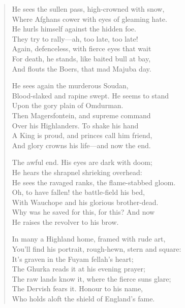 \begin{verse}
He sees the sullen pass, high-crowned with snow,\\
\hspace*{3em}Where Afghans cower with eyes of gleaming hate.\\
He hurls himself against the hidden foe.\\
\hspace*{3em}They try to rally—ah, too late, too late!\\
\hspace*{3em}Again, defenceless, with fierce eyes that wait\\
For death, he stands, like baited bull at bay,\\
And flouts the Boers, that mad Majuba day.

He sees again the murderous Soudan,\\
\hspace*{3em}Blood-slaked and rapine swept. He seems to stand\\
Upon the gory plain of Omdurman.\\
\hspace*{3em}Then Magersfontein, and supreme command\\
\hspace*{3em}Over his Highlanders. To shake his hand\\
A King is proud, and princes call him friend,\\
And glory crowns his life—and now the end.

The awful end. His eyes are dark with doom;\\
\hspace*{3em}He hears the shrapnel shrieking overhead:\\
He sees the ravaged ranks, the flame-stabbed gloom.\\
\hspace*{3em}Oh, to have fallen! the battle-field his bed,\\
\hspace*{3em}With Wauchope and his glorious brother-dead.\\
Why was he saved for this, for this? And now\\
He raises the revolver to his brow.

In many a Highland home, framed with rude art,\\
\hspace*{3em}You'll find his portrait, rough-hewn, stern and square:\\
It's graven in the Fuyam fellah's heart;\\
\hspace*{3em}The Ghurka reads it at his evening prayer;\\
\hspace*{3em}The raw lands know it, where the fierce suns glare;\\
The Dervish fears it. Honour to his name,\\
Who holds aloft the shield of England's fame.


\end{verse}
